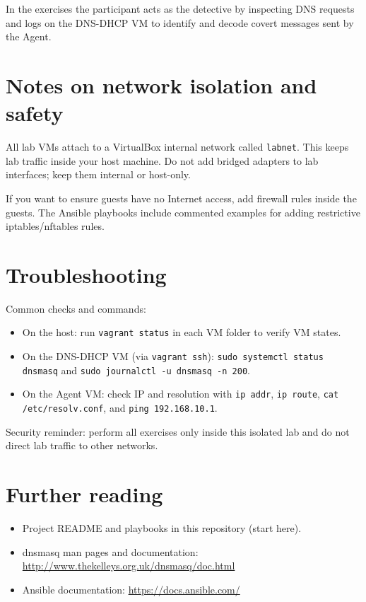 \documentclass[11pt,a4paper]{article}
\begin{document}
In the exercises the participant acts as the detective by inspecting DNS
requests and logs on the DNS-DHCP VM to identify and decode covert
messages sent by the Agent.

\section{Notes on network isolation and safety}
All lab VMs attach to a VirtualBox internal network called
\texttt{labnet}. This keeps lab traffic inside your host machine. Do
not add bridged adapters to lab interfaces; keep them internal or
host-only.

If you want to ensure guests have no Internet access, add firewall
rules inside the guests. The Ansible playbooks include commented
examples for adding restrictive iptables/nftables rules.

\section{Troubleshooting}
Common checks and commands:

\begin{itemize}[noitemsep]
  \item On the host: run \texttt{vagrant status} in each VM folder to
    verify VM states.
  \item On the DNS-DHCP VM (via \texttt{vagrant ssh}):
    \texttt{sudo systemctl status dnsmasq} and
    \texttt{sudo journalctl -u dnsmasq -n 200}.
  \item On the Agent VM: check IP and resolution with \texttt{ip addr},
    \texttt{ip route}, \texttt{cat /etc/resolv.conf}, and
    \texttt{ping 192.168.10.1}.
\end{itemize}

Security reminder: perform all exercises only inside this isolated lab
and do not direct lab traffic to other networks.

\section{Further reading}
\begin{itemize}
  \item Project README and playbooks in this repository (start here).
  \item dnsmasq man pages and documentation: \url{http://www.thekelleys.org.uk/dnsmasq/doc.html}
  \item Ansible documentation: \url{https://docs.ansible.com/}
\end{itemize}
\end{document}

